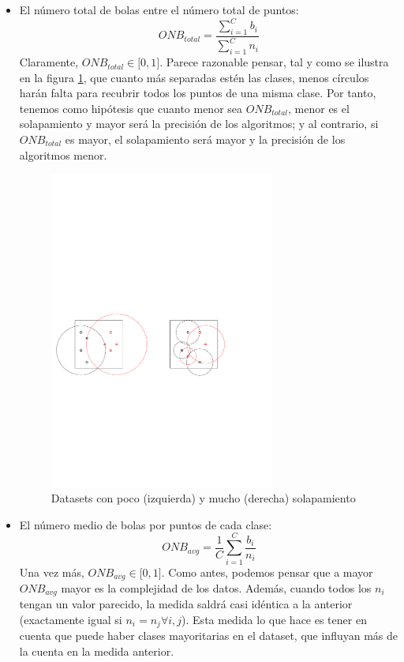 \documentclass[a4paper,12pt]{report}
\theoremstyle{definition}
\begin{document}
\begin{itemize}
\item El número total de bolas entre el número total de puntos:
  $$ ONB_{total} = \frac{\sum_{i=1}^C b_i}{\sum_{i=1}^C n_i} $$
  Claramente, $ONB_{total} \in \lbrack 0, 1 \rbrack$. Parece razonable pensar, tal y como se ilustra en la figura \ref{fig:razonamiento}, que cuanto más separadas estén las clases, menos círculos harán falta para recubrir todos los puntos de una misma clase. Por tanto, tenemos como hipótesis que cuanto menor sea $ONB_{total}$, menor es el solapamiento y mayor será la precisión de los algoritmos; y al contrario, si $ONB_{total}$ es mayor, el solapamiento será mayor y la precisión de los algoritmos menor.

  \begin{figure}[H]
    \centering
    \includegraphics[width=0.7\textwidth]{imgs_cutres/dibujo2}
    \caption{Datasets con poco (izquierda) y mucho (derecha) solapamiento}
    \label{fig:razonamiento}
  \end{figure}


\item El número medio de bolas por puntos de cada clase:
  $$ ONB_{avg} = \frac{1}{C}\sum_{i=1}^C\frac{b_i}{n_i} $$
  Una vez más, $ONB_{avg} \in \lbrack 0, 1 \rbrack$. Como antes, podemos pensar que a mayor $ONB_{avg}$ mayor es la complejidad de los datos. Además, cuando todos los $n_i$ tengan un valor parecido, la medida saldrá casi idéntica a la anterior (exactamente igual si $n_i = n_j \forall i,j$). Esta medida lo que hace es tener en cuenta que puede haber clases mayoritarias en el dataset, que influyan más de la cuenta en la medida anterior.


\end{itemize}
\end{document}
